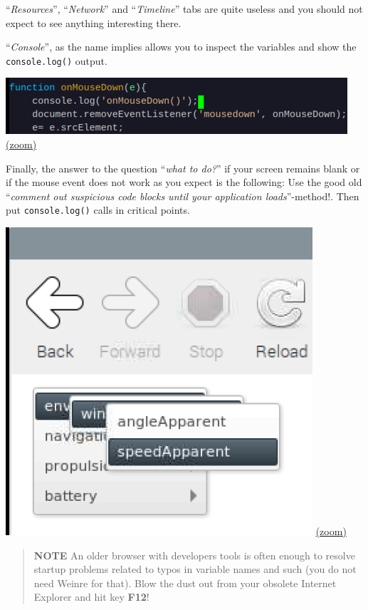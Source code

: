 \documentclass[11pt]{article}
\begin{document}
    ``\emph{Resources}'', ``\emph{Network}'' and ``\emph{Timeline}'' tabs
are quite useless and you should not expect to see anything interesting
there.

    ``\emph{Console}'', as the name implies allows you to inspect the
variables and show the \texttt{console.log()} output.

    \includegraphics{2019-12-25_weinre_server_consolelog_code.png}
\href{img/2019-12-25_weinre_server_consolelog_code.png}{(zoom)}

    Finally, the answer to the question ``\emph{what to do?}'' if your
screen remains blank or if the mouse event does not work as you expect
is the following: Use the good old ``\emph{comment out suspicious code
blocks until your application loads}''-method!. Then put
\texttt{console.log()} calls in critical points.

    \includegraphics{2019-12-25_weinre_server_console_mouse_event.png}
\href{img/2019-12-25_weinre_server_console_mouse_event.png}{(zoom)}

    \begin{quote}
\textbf{NOTE} An older browser with developers tools is often enough to
resolve startup problems related to typos in variable names and such
(you do not need Weinre for that). Blow the dust out from your obsolete
Internet Explorer and hit key \textbf{F12}!
\end{quote}
\end{document}

